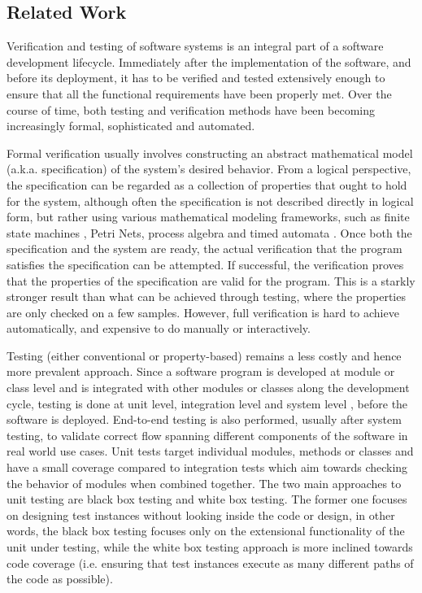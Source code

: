\raggedbottom
\subsection{Related Work}

Verification and testing of software systems \cite{myers2011art} is an integral part of a software development lifecycle. Immediately after the implementation of the software, and before its deployment, it has to be verified and tested extensively enough to ensure that all the functional requirements have been properly met. Over the course of time, both testing and verification methods have been becoming increasingly formal, sophisticated and automated. 

Formal verification usually involves constructing an abstract mathematical model (a.k.a. specification) of the system's desired behavior. From a logical perspective, the specification can be regarded as a collection of properties that ought to hold for the system, although often the specification is not described directly in logical form, but rather using various mathematical modeling frameworks, such as finite state machines \cite{chow1978testing}, Petri Nets, process algebra and timed automata \cite{clarke1996formal}. Once both the specification and the system are ready, the actual verification that the program satisfies the specification can be attempted. If successful, the verification proves that the properties of the specification are valid for the program. This is a starkly stronger result than what can be achieved through testing, where the properties are only checked on a few samples. However, full verification is hard to achieve automatically, and expensive to do manually or interactively.

Testing (either conventional or property-based) remains a less costly and hence more prevalent approach. Since a software program is developed at module or class level and is integrated with other modules or classes along the development cycle, testing is done at unit level, integration level and system level \cite{myers2011art}, before the software is deployed. End-to-end testing \cite{tsai2001end} is also performed, usually after system testing, %
to validate correct flow spanning different components of the software in real world use cases. Unit tests target individual modules, methods or classes and have a small coverage compared to integration tests which aim towards checking the behavior of modules when combined together. The two main approaches to unit testing are black box testing and white box testing. The former one focuses on designing test instances without looking inside the code or design, in other words, the black box testing focuses only on the extensional functionality of the unit under testing, while the white box testing approach is more inclined towards code coverage (i.e. ensuring that test instances execute as many different paths of the code as possible).

